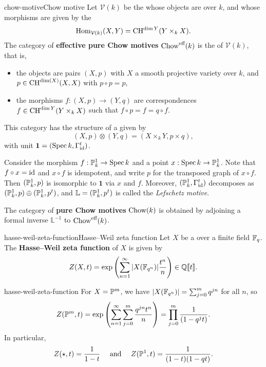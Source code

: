 \begin{topic}{chow-motive}{Chow motive}
    Let $\mathcal{V}(k)$ be the  whose objects are   over $k$, and whose morphisms are given by the 
    \[ \text{Hom}_{\mathcal{V}(k)}(X, Y) = \textup{CH}^{\dim Y}(Y \times_k X) . \]
    The category of \textbf{effective pure Chow motives} $\textup{Chow}^\textup{eff}(k)$ is the  of $\mathcal{V}(k)$, that is,
    \begin{itemize}
        \item the objects are pairs $(X, p)$ with $X$ a smooth projective variety over $k$, and $p \in \textup{CH}^{\dim(X)}(X, X)$ with $p \circ p = p$,
        \item the morphisms $f : (X, p) \to (Y, q)$ are correspondences $f \in \textup{CH}^{\dim Y}(Y \times_k X)$ such that $f \circ p = f = q \circ f$.
    \end{itemize}
    This category has the structure of a  given by
    \[ (X, p) \otimes (Y, q) = (X \times_k Y, p \times q) , \]
    with unit $\textbf{1} = (\operatorname{Spec} k, \Gamma_{\text{id}}^t)$.
    
    Consider the morphism $f : \mathbb{P}^1_k \to \operatorname{Spec} k$ and a point $x : \operatorname{Spec} k \to \mathbb{P}^1_k$. Note that $f \circ x = \text{id}$ and $x \circ f$ is idempotent, and write $p$ for the transposed graph of $x \circ f$. Then $(\mathbb{P}^1_k, p)$ is isomorphic to $\textbf{1}$ via $x$ and $f$. Moreover, $(\mathbb{P}^1_k, \Gamma_{\text{id}}^t)$ decomposes as $(\mathbb{P}^1_k, p) \oplus (\mathbb{P}^1_k, p^t)$, and $\mathbb{L} = (\mathbb{P}^1_k, p^t)$ is called the \textit{Lefschetz motive}.
    
    The category of \textbf{pure Chow motives} $\textup{Chow}(k)$ is obtained by adjoining a formal inverse $\mathbb{L}^{-1}$ to $\textup{Chow}^\textup{eff}(k)$.
\end{topic}

\begin{topic}{hasse-weil-zeta-function}{Hasse--Weil zeta function}
    Let $X$ be a  over a finite field $\mathbb{F}_q$. The \textbf{Hasse--Weil zeta function} of $X$ is given by
    \[ Z(X, t) = \exp \left( \sum_{n = 1}^{\infty} |X(\mathbb{F}_{q^n})| \frac{t^n}{n} \right) \in \mathbb{Q} \llbracket t \rrbracket . \]
\end{topic}

\begin{example}{hasse-weil-zeta-function}
    For $X = \mathbb{P}^m$, we have $|X(\mathbb{F}_{q^n})| = \sum_{j = 0}^{m} q^{jn}$ for all $n$, so
    \[ Z(\mathbb{P}^m, t) = \exp \left( \sum_{n = 1}^{\infty} \sum_{j = 0}^{m} \frac{q^{jn} t^n}{n} \right) = \prod_{j = 0}^{m} \frac{1}{(1 - q^j t)} . \]
    In particular,
    \[ Z(\star, t) = \frac{1}{1 - t} \quad \textup{ and } \quad Z(\mathbb{P}^1, t) = \frac{1}{(1 - t)(1 - qt)} . \]
\end{example}

